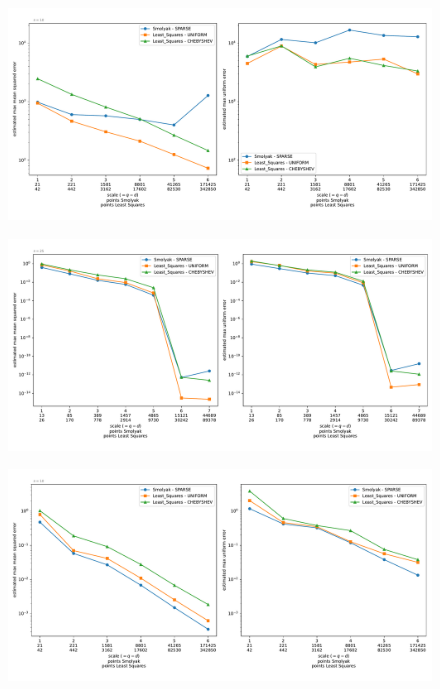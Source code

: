 \documentclass[12pt, oneside]{amsart}
\theoremstyle{definition}
\theoremstyle{remark}
\numberwithin{equation}{section}
\begin{document}
\begin{figure}[h]
	\centering
	\includegraphics[width=\linewidth]{figures/roos_arnold/dim10/max_error_distribution_fixed_dim}
	\caption{}
	\label{fig:roos_arnold_dim10}
\end{figure}


\begin{figure}[h]
	\centering
	\includegraphics[width=\linewidth]{figures/bratley/dim6/max_error_distribution_fixed_dim}
	\caption{}
	\label{fig:bratley_dim6}
\end{figure}

\begin{figure}[h]
	\centering
	\includegraphics[width=\linewidth]{figures/bratley/dim10/max_error_distribution_fixed_dim}
	\caption{}
	\label{fig:bratley_dim10}
\end{figure}
\end{document}
